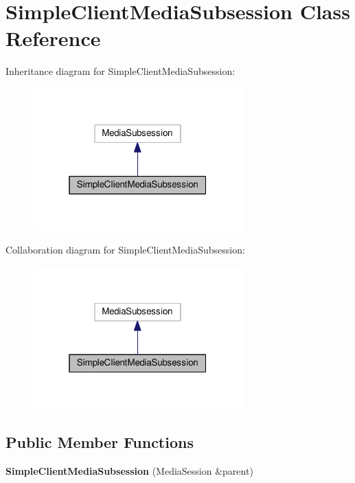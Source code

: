 \hypertarget{classSimpleClientMediaSubsession}{}\section{Simple\+Client\+Media\+Subsession Class Reference}
\label{classSimpleClientMediaSubsession}


Inheritance diagram for Simple\+Client\+Media\+Subsession\+:\nopagebreak
\begin{figure}[H]
\begin{center}
\leavevmode
\includegraphics[width=229pt]{classSimpleClientMediaSubsession__inherit__graph}
\end{center}
\end{figure}


Collaboration diagram for Simple\+Client\+Media\+Subsession\+:\nopagebreak
\begin{figure}[H]
\begin{center}
\leavevmode
\includegraphics[width=229pt]{classSimpleClientMediaSubsession__coll__graph}
\end{center}
\end{figure}
\subsection*{Public Member Functions}
\begin{DoxyCompactItemize}
\item 
{\bfseries Simple\+Client\+Media\+Subsession} (Media\+Session \&parent)\hypertarget{classSimpleClientMediaSubsession_a05852eef8e2ea3c30db36f66aae7b767}{}\label{classSimpleClientMediaSubsession_a05852eef8e2ea3c30db36f66aae7b767}

\end{DoxyCompactItemize}
